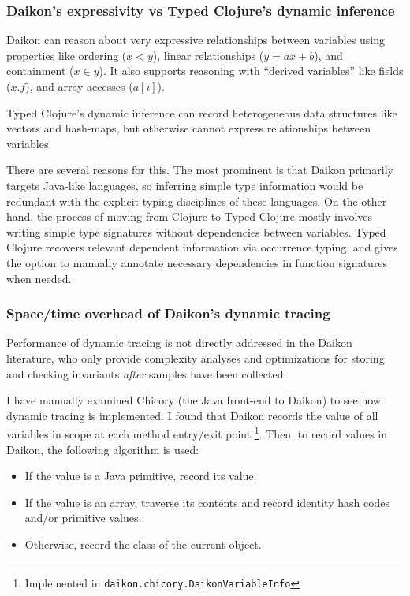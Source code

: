 \subsubsection{Daikon's expressivity vs Typed Clojure's dynamic inference}

Daikon can reason about very expressive relationships between variables
using properties like ordering ($x < y$), linear relationships ($y = ax + b$),
and containment ($x \in y$). It also supports reasoning with ``derived variables''
like fields ($x.f$), and array accesses ($a[i]$).

Typed Clojure's dynamic inference can record heterogeneous data structures
like vectors and hash-maps, but otherwise cannot express relationships
between variables.

There are several reasons for this. The most prominent is that Daikon
primarily targets Java-like languages, so inferring simple type information
would be redundant with the explicit typing disciplines of these languages.
On the other hand, the process of moving from Clojure to Typed Clojure
mostly involves writing simple type signatures without dependencies
between variables. Typed Clojure recovers relevant dependent information
via occurrence typing, and gives the option to manually annotate necessary
dependencies in function signatures when needed.

\subsubsection{Space/time overhead of Daikon's dynamic tracing}

Performance of dynamic tracing is not directly addressed in the Daikon
literature, who only provide complexity analyses and optimizations for storing
and checking invariants \emph{after} samples have been collected.

I have manually examined Chicory (the Java front-end to Daikon) to see how
dynamic tracing is implemented.
I found that Daikon records the value of all variables in scope
at each method entry/exit point \footnote{Implemented in \texttt{daikon.chicory.DaikonVariableInfo}}.
Then, to record values in Daikon, the following algorithm is used:

\begin{itemize}
  \item If the value is a Java primitive, record its value.
  \item If the value is an array, traverse its contents and record identity hash codes
    and/or primitive values.
  \item Otherwise, record the class of the current object.
\end{itemize}

